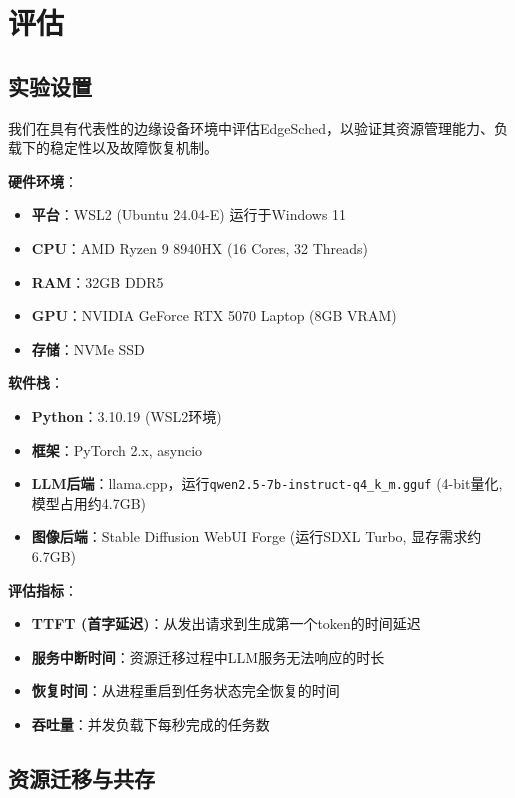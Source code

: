 \section{评估}

\subsection{实验设置}

我们在具有代表性的边缘设备环境中评估EdgeSched，以验证其资源管理能力、负载下的稳定性以及故障恢复机制。

\textbf{硬件环境}：
\begin{itemize}
\item \textbf{平台}：WSL2 (Ubuntu 24.04-E) 运行于Windows 11
\item \textbf{CPU}：AMD Ryzen 9 8940HX (16 Cores, 32 Threads)
\item \textbf{RAM}：32GB DDR5
\item \textbf{GPU}：NVIDIA GeForce RTX 5070 Laptop (8GB VRAM)
\item \textbf{存储}：NVMe SSD
\end{itemize}

\textbf{软件栈}：
\begin{itemize}
\item \textbf{Python}：3.10.19 (WSL2环境)
\item \textbf{框架}：PyTorch 2.x, asyncio
\item \textbf{LLM后端}：llama.cpp，运行\texttt{qwen2.5-7b-instruct-q4\_k\_m.gguf} (4-bit量化, 模型占用约4.7GB)
\item \textbf{图像后端}：Stable Diffusion WebUI Forge (运行SDXL Turbo, 显存需求约6.7GB)
\end{itemize}

\textbf{评估指标}：
\begin{itemize}
\item \textbf{TTFT (首字延迟)}：从发出请求到生成第一个token的时间延迟
\item \textbf{服务中断时间}：资源迁移过程中LLM服务无法响应的时长
\item \textbf{恢复时间}：从进程重启到任务状态完全恢复的时间
\item \textbf{吞吐量}：并发负载下每秒完成的任务数
\end{itemize}

\subsection{资源迁移与共存}

